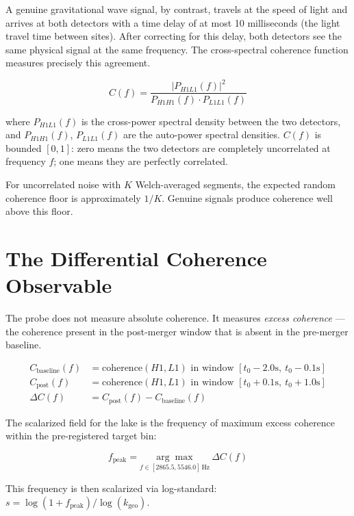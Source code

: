 \documentclass[11pt, letterpaper, openany]{book}
\begin{document}
A genuine gravitational wave signal, by contrast, travels at the speed
of light and arrives at both detectors with a time delay of at most
10 milliseconds (the light travel time between sites). After correcting
for this delay, both detectors see the same physical signal at the same
frequency. The cross-spectral coherence function measures precisely this
agreement.

\begin{equation}
C(f) = \frac{|P_{H1L1}(f)|^2}{P_{H1H1}(f) \cdot P_{L1L1}(f)}
\end{equation}

where $P_{H1L1}(f)$ is the cross-power spectral density between the
two detectors, and $P_{H1H1}(f)$, $P_{L1L1}(f)$ are the auto-power
spectral densities. $C(f)$ is bounded $[0, 1]$: zero means the two
detectors are completely uncorrelated at frequency $f$; one means they
are perfectly correlated.

For uncorrelated noise with $K$ Welch-averaged segments, the expected
random coherence floor is approximately $1/K$. Genuine signals produce
coherence well above this floor.

\section*{The Differential Coherence Observable}

The probe does not measure absolute coherence. It measures
\emph{excess coherence} --- the coherence present in the post-merger
window that is absent in the pre-merger baseline.

\begin{align}
C_{\text{baseline}}(f) &= \text{coherence}(H1, L1) \text{ in window } [t_0 - 2.0\text{s},\ t_0 - 0.1\text{s}] \\
C_{\text{post}}(f) &= \text{coherence}(H1, L1) \text{ in window } [t_0 + 0.1\text{s},\ t_0 + 1.0\text{s}] \\
\Delta C(f) &= C_{\text{post}}(f) - C_{\text{baseline}}(f)
\end{align}

The scalarized field for the lake is the frequency of maximum excess
coherence within the pre-registered target bin:

\begin{equation}
f_{\text{peak}} = \underset{f \in [2865.5, 5546.0]\,\text{Hz}}{\arg\max}\ \Delta C(f)
\end{equation}

This frequency is then scalarized via log-standard:
$s = \log(1 + f_{\text{peak}}) / \log(k_{\text{geo}})$.
\end{document}
